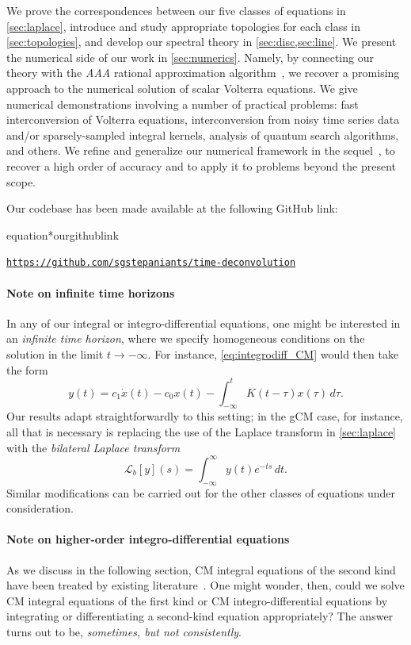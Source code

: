 \documentclass{cams-l} %
\newcommand{\dave}[1]{#1}\newcommand{\davebegin}{}\newcommand{\daveend}{}\newcommand{\george}[1]{#1}
\newcommand{\cL}{\mathcal L}
\theoremstyle{definition}
\theoremstyle{remark}
\numberwithin{equation}{section}
\begin{document}
We prove the correspondences between our five classes of equations in \cref{sec:laplace}, introduce and study appropriate topologies for each class in \cref{sec:topologies}, and develop our spectral theory in \cref{sec:disc,sec:line}. We present the numerical side of our work in \cref{sec:numerics}. Namely, by connecting our theory with the \emph{AAA} rational approximation algorithm~\cite{nakatsukasa2018aaa}, we recover a promising approach to the numerical solution of scalar Volterra equations. We give numerical demonstrations involving a number of practical problems: fast interconversion of Volterra equations, interconversion from noisy time series data and/or sparsely-sampled integral kernels, analysis of quantum search algorithms, and others. We refine and generalize our numerical framework in the sequel~\cite{sieve}, to recover a high order of accuracy and to apply it to problems beyond the present scope.

Our codebase has been made available at the following GitHub link:
\begin{restatable}{equation*}{ourgithublink}
    \parbox{\dimexpr\linewidth-4em}{%
		\strut
		\texttt{\url{https://github.com/sgstepaniants/time-deconvolution}}
		\strut
	}
\end{restatable}


\daveend


\bigskip

\paragraph{\bfseries Note on infinite time horizons}\label{sec:note_initialconds}
In any of our integral or integro-differential equations, one might be interested in an \emph{infinite time horizon}, where we specify homogeneous conditions on the solution in the limit $t\to-\infty$. For instance, \ref{eq:integrodiff_CM} would then take the form
\[y(t) = c_1\dot{x}(t) - c_0x(t) - \int_{-\infty}^t K(t-\tau)x(\tau)\,d\tau.\]
Our results adapt straightforwardly to this setting; in the gCM case, for instance, all that is necessary is replacing the use of the Laplace transform in \cref{sec:laplace} with the \emph{bilateral Laplace transform}
\[\cL_b[y](s) = \int_{-\infty}^\infty y(t) e^{-ts}\,dt.\]
Similar modifications can be carried out for the other classes of equations under consideration.

\bigskip

\paragraph{\bfseries Note on higher-order integro-differential equations} As we \dave{discuss in the following section, CM integral equations of the second kind have been treated by existing literature~\cite{loy_anderssen}. One might wonder, then, could we solve CM integral equations of the first kind  or CM integro-differential equations by integrating or differentiating a second-kind equation appropriately? The answer turns out to be, \emph{sometimes, but not consistently}.}
\end{document}
